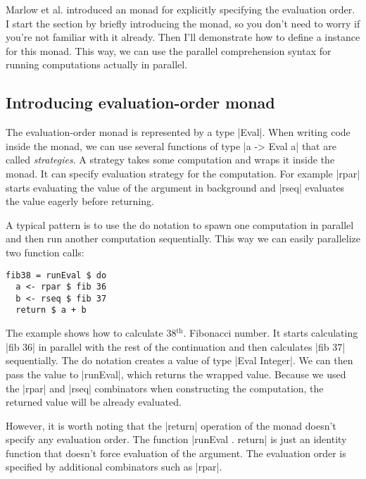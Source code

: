 \documentclass{tmr}
\begin{document}
Marlow et al. \cite{strategies-new} introduced an  monad for explicitly 
specifying the evaluation order. I start the section by briefly introducing the monad, so you don't 
need to worry if you're not familiar with it already. Then I'll demonstrate how to define a 
 instance for this monad. This way, we can use the parallel 
comprehension syntax for running computations actually in parallel.


\subsection{Introducing evaluation-order monad}

The evaluation-order monad is represented by a type |Eval|. When writing code inside the monad,
we can use several functions of type |a -> Eval a| that are called \textit{strategies}. A strategy
takes some computation and wraps it inside the monad. It can specify evaluation strategy for the
computation. For example |rpar| starts evaluating the value of the argument in background and
|rseq| evaluates the value eagerly before returning. 

A typical pattern is to use the do notation to spawn one computation in parallel and then 
run another computation sequentially. This way we can easily parallelize two function calls:

\begin{verbatim}
fib38 = runEval $ do 
  a <- rpar $ fib 36
  b <- rseq $ fib 37
  return $ a + b
\end{verbatim}

The example shows how to calculate 38$^\text{th}$. Fibonacci number. It starts calculating 
|fib 36| in parallel with the rest of the continuation and then calculates 
|fib 37| sequentially. The do notation creates a value of type |Eval Integer|. 
We can then pass the value to |runEval|, which returns the wrapped value. Because we used the
|rpar| and |rseq| combinators when constructing the computation, the returned value will 
be already evaluated.

However, it is worth noting that the |return| operation of the monad doesn't specify any evaluation 
order. The function |runEval . return| is just an identity function that doesn't force evaluation 
of the argument. The evaluation order is specified by additional combinators such as |rpar|.
\end{document}
